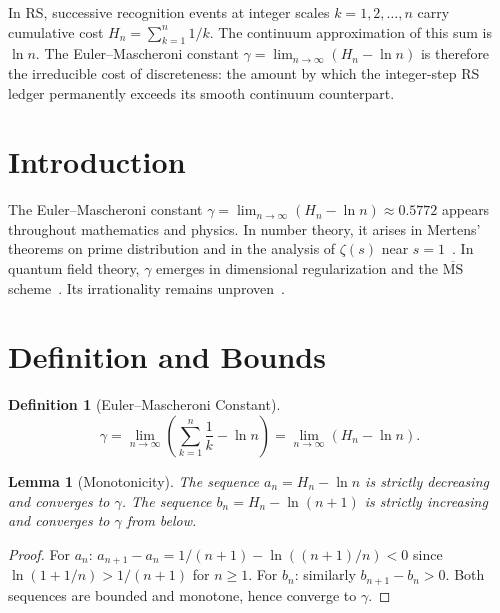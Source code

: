\documentclass[12pt,a4paper]{article}
\newtheorem{lemma}[theorem]{Lemma}
\theoremstyle{definition}
\newtheorem{definition}[theorem]{Definition}
\theoremstyle{remark}
\begin{document}
\noindent In RS, successive recognition events at integer scales $k=1,
2,\ldots,n$ carry cumulative cost $H_n = \sum_{k=1}^n 1/k$.
The continuum approximation of this sum is $\ln n$.  The
Euler--Mascheroni constant $\gamma = \lim_{n\to\infty}(H_n - \ln n)$
is therefore the irreducible cost of discreteness: the amount by
which the integer-step RS ledger permanently exceeds its smooth
continuum counterpart.

\section{Introduction}
\label{sec:intro}

The Euler--Mascheroni constant
$\gamma = \lim_{n\to\infty}(H_n - \ln n) \approx 0.5772$ appears
throughout mathematics and physics.  In number theory, it arises in
Mertens' theorems on prime distribution and in the analysis of
$\zeta(s)$ near $s = 1$~\cite{Lagarias}.  In quantum field theory,
$\gamma$ emerges in dimensional regularization and the
$\overline{\mathrm{MS}}$ scheme~\cite{Collins}.  Its irrationality
remains unproven~\cite{Papanikolaou}.

\section{Definition and Bounds}
\label{sec:bounds}

\begin{definition}[Euler--Mascheroni Constant]
\label{def:gamma}
\begin{equation}
  \gamma = \lim_{n\to\infty}\left(\sum_{k=1}^n \frac{1}{k}
  - \ln n\right) = \lim_{n\to\infty}(H_n - \ln n).
\end{equation}
\end{definition}

\begin{lemma}[Monotonicity]
\label{lem:mono}
The sequence $a_n = H_n - \ln n$ is strictly decreasing and
converges to $\gamma$.  The sequence $b_n = H_n - \ln(n+1)$ is
strictly increasing and converges to $\gamma$ from below.
\end{lemma}

\begin{proof}
For $a_n$: $a_{n+1} - a_n = 1/(n+1) - \ln((n+1)/n) < 0$ since
$\ln(1 + 1/n) > 1/(n+1)$ for $n \geq 1$.  For $b_n$: similarly
$b_{n+1} - b_n > 0$.  Both sequences are bounded and monotone,
hence converge to $\gamma$.
\end{proof}
\end{document}
